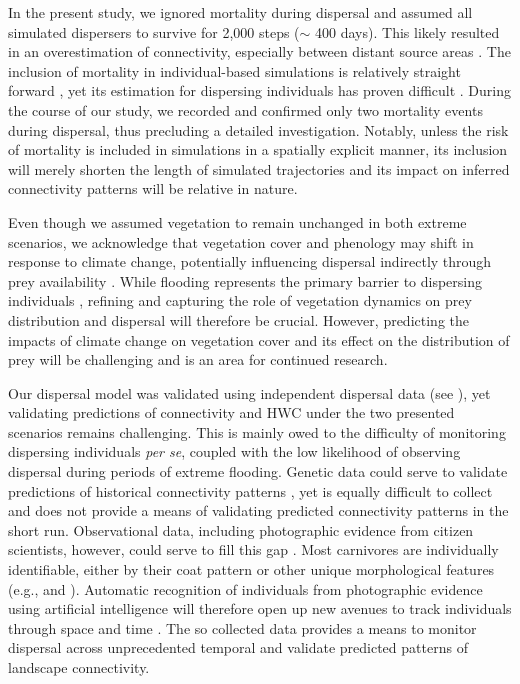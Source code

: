 \documentclass[abstract=on,10pt,a4paper,bibliography=totocnumbered]{article}
\begin{document}
In the present study, we ignored mortality during dispersal and assumed all
simulated dispersers to survive for 2,000 steps ($\sim$ 400 days). This likely
resulted in an overestimation of connectivity, especially between distant source
areas \citep{Kramer-Schadt.2004, Diniz.2019, Day.2020, FletcherJr..2019}. The
inclusion of mortality in individual-based simulations is relatively straight
forward \citep{FletcherJr..2019, FletcherJr..2023}, yet its estimation for
dispersing individuals has proven difficult \citep{Behr.2023}. During the course
of our study, we recorded and confirmed only two mortality events during
dispersal, thus precluding a detailed investigation. Notably, unless the risk of
mortality is included in simulations in a spatially explicit manner, its
inclusion will merely shorten the length of simulated trajectories and its
impact on inferred connectivity patterns will be relative in nature.

Even though we assumed vegetation to remain unchanged in both extreme scenarios,
we acknowledge that vegetation cover and phenology may shift in response to
climate change, potentially influencing dispersal indirectly through prey
availability \citep{Bonyongo.2005}. While flooding represents the primary
barrier to dispersing individuals \citep{Cozzi.2020, Hofmann.2021,
Hofmann.2023}, refining and capturing the role of vegetation dynamics on prey
distribution and dispersal will therefore be crucial. However, predicting the
impacts of climate change on vegetation cover and its effect on the
distribution of prey will be challenging and is an area for continued research.

Our dispersal model was validated using independent dispersal data (see
\citealp{Hofmann.2023}), yet validating predictions of connectivity and HWC
under the two presented scenarios remains challenging. This is mainly owed to
the difficulty of monitoring dispersing individuals \textit{per se}, coupled
with the low likelihood of observing dispersal during periods of extreme
flooding. Genetic data could serve to validate predictions of historical
connectivity patterns \citep{Cushman.2010, Spear.2010}, yet is equally difficult
to collect and does not provide a means of validating predicted connectivity
patterns in the short run. Observational data, including photographic evidence
from citizen scientists, however, could serve to fill this gap
\citep{Marnewick.2014, Cozzi.2023}. Most carnivores are individually
identifiable, either by their coat pattern or other unique morphological
features (e.g., \citealp{Pennycuick.1970} and \citealp{Kelly.2001}). Automatic
recognition of individuals from photographic evidence using artificial
intelligence will therefore open up new avenues to track individuals through
space and time \citep{Cozzi.2023}. The so collected data provides a means to
monitor dispersal across unprecedented temporal and validate predicted patterns
of landscape connectivity.
\end{document}
